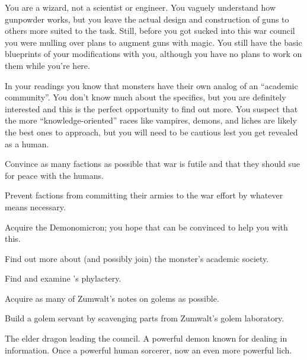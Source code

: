 \documentclass[char]{guildcamp2}
\begin{document}

You are a wizard, not a scientist or engineer. You vaguely understand how gunpowder works, but you leave the actual design and construction of guns to others more suited to the task. Still, before you got sucked into this war council you were mulling over plans to augment guns with magic. You still have the basic blueprints of your modifications with you, although you have no plans to work on them while you're here.

In your readings you know that monsters have their own analog of an ``academic community''. You don't know much about the specifics, but you are definitely interested and this is the perfect opportunity to find out more. You suspect that the more ``knowledge-oriented'' races like vampires, demons, and liches are likely the best ones to approach, but you will need to be cautious lest you get revealed as a human.

\begin{itemz}[Goals]
  \item Convince as many factions as possible that war is futile and that they should sue for peace with the humans.
  \item Prevent factions from committing their armies to the war effort by whatever means necessary.
  \item Acquire the Demonomicron; you hope that \cDemon{} can be convinced to help you with this.
  \item Find out more about (and possibly join) the monster's academic society.
  \item Find and examine \cLich{}'s phylactery.
  \item Acquire as many of Zumwalt's notes on golems as possible.
  \item Build a golem servant by scavenging parts from Zumwalt's golem laboratory.
\end{itemz}

\begin{contacts}
  \contact{\cOnyx{}} The elder dragon leading the council.
  \contact{\cDemon{}} A powerful demon known for dealing in information.
  \contact{\cLich{}} Once a powerful human sorcerer, now an even more powerful lich.
\end{contacts}
\end{document}
